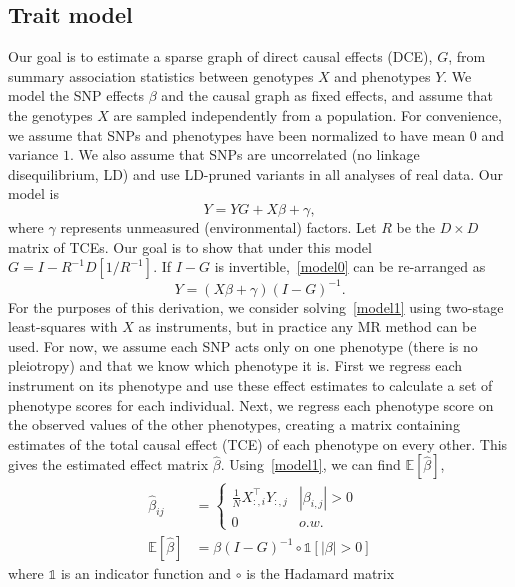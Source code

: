 \documentclass{article}
\begin{document}
\subsection{Trait model}
Our goal is to estimate a sparse graph of direct causal effects (DCE), $G$, from
summary association statistics between genotypes $X$ and phenotypes $Y$. We model
the SNP effects $\beta$ and the causal graph as fixed effects, and assume that the genotypes
$X$ are sampled independently from a population. For convenience, we assume that SNPs
 and phenotypes have been normalized
 to have mean $0$ and variance $1$. We also assume that SNPs are uncorrelated (no linkage disequilibrium, LD)
and use LD-pruned variants in all analyses of real data.
Our model is
\begin{equation}\label{model0}
 Y = Y G + X \beta + \gamma,
\end{equation}
where $\gamma$ represents unmeasured (environmental) factors.
Let $R$ be the $D \times D$ matrix of TCEs. Our goal is to show that under this model
$G = I - R^{-1} D[1 / R^{-1}]$.
If $I - G$ is invertible,~\eqref{model0} can be re-arranged as
\begin{equation}\label{model1}
Y = (X \beta + \gamma)(I - G)^{-1}.
\end{equation}
For the purposes of this derivation, we consider solving~\eqref{model1}
using two-stage least-squares with $X$ as instruments, but in practice any MR method can be used.
For now, we assume each SNP acts only on one phenotype
(there is no pleiotropy) and that we know which phenotype it is.
First we regress each instrument on its phenotype and use these effect
 estimates to calculate a set of phenotype scores for each individual.
Next, we regress each phenotype score on the observed values of the other phenotypes,
 creating a matrix containing estimates of the total causal effect (TCE) of
 each phenotype on every other. This gives the estimated effect matrix $\hat{\beta}$.
Using~\eqref{model1}, we can find $\mathbb{E}[\hat{\beta} ]$,
\begin{align*}
\hat{\beta}_{ij} &= \left\{
 \begin{array}{ll}
  \frac{1}{N} X_{:, i}^{\top}Y_{:,j} & |\beta_{i,j}| > 0 \\
  0 & o.w.
 \end{array} \right. \\
 \mathbb{E}[\hat{\beta} ] &= \beta (I-G)^{-1} \circ \mathds{1}[|\beta| > 0]
\end{align*}
where $\mathds{1}$ is an indicator function and $\circ$ is the Hadamard matrix
\end{document}
